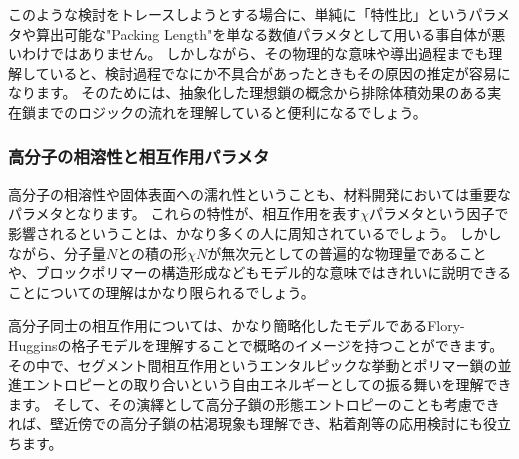 \documentclass[a4paper,11pt]{jlreq}
\begin{document}
このような検討をトレースしようとする場合に、単純に「特性比」というパラメタや算出可能な"Packing Length"を単なる数値パラメタとして用いる事自体が悪いわけではありません。
しかしながら、その物理的な意味や導出過程までも理解していると、検討過程でなにか不具合があったときもその原因の推定が容易になります。
そのためには、抽象化した理想鎖の概念から排除体積効果のある実在鎖までのロジックの流れを理解していると便利になるでしょう。

\subsubsection{高分子の相溶性と相互作用パラメタ}
高分子の相溶性や固体表面への濡れ性ということも、材料開発においては重要なパラメタとなります。
これらの特性が、相互作用を表す$\chi$パラメタという因子で影響されるということは、かなり多くの人に周知されているでしょう。
しかしながら、分子量$N$との積の形$\chi N$が無次元としての普遍的な物理量であることや、ブロックポリマーの構造形成などもモデル的な意味ではきれいに説明できることについての理解はかなり限られるでしょう。

高分子同士の相互作用については、かなり簡略化したモデルであるFlory-Hugginsの格子モデルを理解することで概略のイメージを持つことができます。
その中で、セグメント間相互作用というエンタルピックな挙動とポリマー鎖の並進エントロピーとの取り合いという自由エネルギーとしての振る舞いを理解できます。
そして、その演繹として高分子鎖の形態エントロピーのことも考慮できれば、壁近傍での高分子鎖の枯渇現象も理解でき、粘着剤等の応用検討にも役立ちます。



\end{document}
